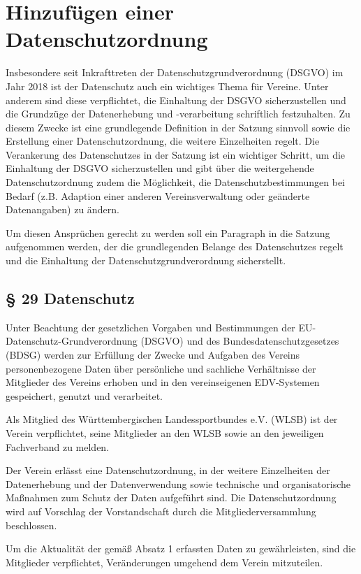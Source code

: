 \documentclass[10pt,a4paper,parskip=half]{scrartcl}
\newcommand{\change}[1]{
  \begin{adjustwidth}{20pt}{20pt}
    #1
  \end{adjustwidth}
}
\begin{document}
\section{Hinzufügen einer Datenschutzordnung}
Insbesondere seit Inkrafttreten der Datenschutzgrundverordnung (DSGVO) im Jahr 2018 ist der Datenschutz auch ein wichtiges Thema für Vereine. Unter anderem sind diese verpflichtet, die Einhaltung der DSGVO sicherzustellen und die Grundzüge der Datenerhebung und -verarbeitung schriftlich festzuhalten. Zu diesem Zwecke ist eine grundlegende Definition in der Satzung sinnvoll sowie die Erstellung einer Datenschutzordnung, die weitere Einzelheiten regelt. Die Verankerung des Datenschutzes in der Satzung ist ein wichtiger Schritt,  um die Einhaltung der DSGVO sicherzustellen und gibt über die weitergehende Datenschutzordnung zudem die Möglichkeit, die Datenschutzbestimmungen bei Bedarf (z.B. Adaption einer anderen Vereinsverwaltung oder geänderte Datenangaben) zu ändern.

Um diesen Ansprüchen gerecht zu werden soll ein Paragraph in die Satzung aufgenommen werden, der die grundlegenden Belange des Datenschutzes regelt und die Einhaltung der Datenschutzgrundverordnung sicherstellt.

\change{
  \subsection*{§ 29 Datenschutz}

  Unter Beachtung der gesetzlichen Vorgaben und Bestimmungen der EU\--Daten\-schutz\--Grund\-verordnung (DSGVO) und des Bundes\-datenschutz\-gesetzes (BDSG) werden zur Erfüllung der Zwecke und Aufgaben des Vereins personenbezogene Daten über persönliche und sachliche Verhältnisse der Mitglieder des Vereins erhoben und in den vereinseigenen EDV-Systemen gespeichert, genutzt und verarbeitet.

  Als Mitglied des Württembergischen Landessportbundes e.V. (WLSB) ist der Verein verpflichtet, seine Mitglieder an den WLSB sowie an den jeweiligen Fachverband zu melden.

  Der Verein erlässt eine Datenschutzordnung, in der weitere Einzelheiten der Datenerhebung und der Datenverwendung sowie technische und organisatorische Maßnahmen zum Schutz der Daten aufgeführt sind. Die Datenschutzordnung wird auf Vorschlag der Vorstandschaft durch die Mitgliederversammlung beschlossen.

  Um die Aktualität der gemäß Absatz 1 erfassten Daten zu gewährleisten,
  sind die Mitglieder verpflichtet, Veränderungen umgehend dem Verein mitzuteilen.
}
\clearpage
\end{document}

